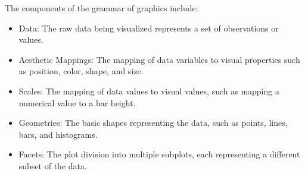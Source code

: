 \documentclass[print]{nuthesis}
\providecommand{\tightlist}{%
  \setlength{\itemsep}{0pt}\setlength{\parskip}{0pt}}
\begin{document}

The components of the grammar of graphics include:

\begin{itemize}
\tightlist
\item
  Data: The raw data being visualized represents a set of observations or values.
\item
  Aesthetic Mappings: The mapping of data variables to visual properties such as position, color, shape, and size.
\item
  Scales: The mapping of data values to visual values, such as mapping a numerical value to a bar height.
\item
  Geometries: The basic shapes representing the data, such as points, lines, bars, and histograms.
\item
  Facets: The plot division into multiple subplots, each representing a different subset of the data.
\end{itemize}
\end{document}
